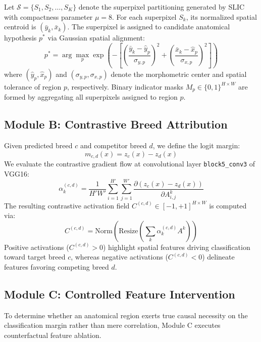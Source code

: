 \documentclass[conference]{IEEEtran}
\begin{document}
Let $\mathcal{S} = \{S_1, S_2, \dots, S_K\}$ denote the superpixel partitioning generated by SLIC with compactness parameter $\mu = 8$. For each superpixel $S_k$, its normalized spatial centroid is $(\bar{y}_k, \bar{x}_k)$. The superpixel is assigned to candidate anatomical hypothesis $p^*$ via Gaussian spatial alignment:
\begin{equation}
p^* = \arg\max_{p} \exp\left( - \left[ \left(\frac{\bar{y}_k - \hat{y}_p}{\sigma_{y,p}}\right)^2 + \left(\frac{\bar{x}_k - \hat{x}_p}{\sigma_{x,p}}\right)^2 \right] \right)
\end{equation}
where $(\hat{y}_p, \hat{x}_p)$ and $(\sigma_{y,p}, \sigma_{x,p})$ denote the morphometric center and spatial tolerance of region $p$, respectively. Binary indicator masks $M_p \in \{0, 1\}^{H \times W}$ are formed by aggregating all superpixels assigned to region $p$.

\subsection{Module B: Contrastive Breed Attribution}
Given predicted breed $c$ and competitor breed $d$, we define the logit margin:
\begin{equation}
m_{c,d}(x) = z_c(x) - z_d(x)
\end{equation}
We evaluate the contrastive gradient flow at convolutional layer \texttt{block5\_conv3} of VGG16:
\begin{equation}
\alpha_k^{(c,d)} = \frac{1}{H' W'} \sum_{i=1}^{H'} \sum_{j=1}^{W'} \frac{\partial (z_c(x) - z_d(x))}{\partial A_{i,j}^k}
\end{equation}
The resulting contrastive activation field $C^{(c,d)} \in [-1, +1]^{H \times W}$ is computed via:
\begin{equation}
C^{(c,d)} = \text{Norm}\left( \text{Resize}\left( \sum_{k} \alpha_k^{(c,d)} A^k \right) \right)
\end{equation}
Positive activations ($C^{(c,d)} > 0$) highlight spatial features driving classification toward target breed $c$, whereas negative activations ($C^{(c,d)} < 0$) delineate features favoring competing breed $d$.

\subsection{Module C: Controlled Feature Intervention}
To determine whether an anatomical region exerts true causal necessity on the classification margin rather than mere correlation, Module C executes counterfactual feature ablation.
\end{document}
